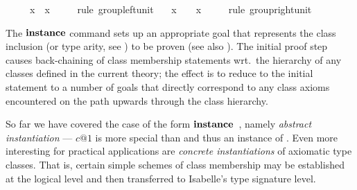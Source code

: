 \begin{isabellebody}
\ \ \ {\isachardoublequote}{\isasymunit}\ {\isasymodot}\ x\ {\isacharequal}\ x{\isachardoublequote}\isanewline
\ \ \ \ \ {\isacharparenleft}rule\ group{\isachardot}left{\isacharunderscore}unit{\isacharparenright}\isanewline
\ \ \ {\isachardoublequote}x\ {\isasymodot}\ {\isasymunit}\ {\isacharequal}\ x{\isachardoublequote}\isanewline
\ \ \ \ \ {\isacharparenleft}rule\ group{\isacharunderscore}right{\isacharunderscore}unit{\isacharparenright}\isanewline
{}%
\begin{isamarkuptext}%
\medskip The ${\mathord{\mathbf{instance}}}$ command sets up an appropriate goal that
 represents the class inclusion (or type arity, see
 ) to be proven (see also
 \cite{isabelle-isar-ref}).  The initial proof step causes
 back-chaining of class membership statements wrt.\ the hierarchy of
 any classes defined in the current theory; the effect is to reduce to
 the initial statement to a number of goals that directly correspond
 to any class axioms encountered on the path upwards through the class
 hierarchy.%
\end{isamarkuptext}%
%
%
\begin{isamarkuptext}%
So far we have covered the case of the form ${\mathord{\mathbf{instance}}}$~, namely \emph{abstract instantiation} ---
 $c@1$ is more special than  and thus an instance
 of .  Even more interesting for practical
 applications are \emph{concrete instantiations} of axiomatic type
 classes.  That is, certain simple schemes
  of class membership may be
 established at the logical level and then transferred to Isabelle's
 type signature level.


\end{isamarkuptext}
\end{isabellebody}
